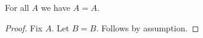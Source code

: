 \begin{proposition}\label{phase5_local_definition_failure}
    For all $A$ we have $A = A$.
\end{proposition}
\begin{proof}
    Fix $A$.
    Let $B = B$.
    Follows by assumption.
\end{proof}
